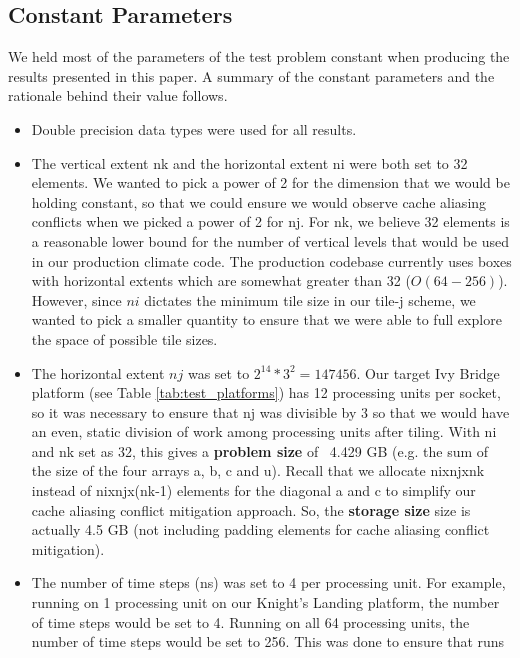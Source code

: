 \documentclass{sig-alternate-05-2015}
\begin{document}
\subsection{Constant Parameters}
\label{sec:experimental_setup:constant_parameters}

We held most of the parameters of the test problem constant when producing the
results presented in this paper. A summary of the constant parameters and the
rationale behind their value follows.

\begin{itemize}
\item Double precision data types were used for all results. 
\item The vertical extent nk and the horizontal extent ni were both set to 32
elements. We wanted to pick a power of 2 for the dimension that we would be
holding constant, so that we could ensure we would observe cache aliasing
conflicts when we picked a power of 2 for nj. For nk, we believe 32 elements is
a reasonable lower bound for the number of vertical levels that would be used
in our production climate code. The production codebase currently uses boxes
with horizontal extents which are somewhat greater than 32 (\(O(64-256)\)).
However, since $ni$ dictates the minimum tile size in our tile-j scheme, we
wanted to pick a smaller quantity to ensure that we were able to full explore
the space of possible tile sizes. 
\item The horizontal extent $nj$ was set to \(2^14*3^2=147456\). Our target Ivy
Bridge platform (see Table \ref{tab:test_platforms}) has 12 processing units
per socket, so it was necessary to ensure that nj was divisible by 3 so that we
would have an even, static division of work among processing units after
tiling. With ni and nk set as 32, this gives a \textbf{problem size} of ~4.429
GB (e.g. the sum of the size of the four arrays a, b, c and u). Recall that we
allocate nixnjxnk instead of nixnjx(nk-1) elements for the diagonal a and c to
simplify our cache aliasing conflict mitigation approach. So, the
\textbf{storage size} size is actually 4.5 GB (not including padding elements
for cache aliasing conflict mitigation).
\item The number of time steps (ns) was set to 4 per processing unit. For
example, running on 1 processing unit on our Knight's Landing platform, the
number of time steps would be set to 4. Running on all 64 processing units, the
number of time steps would be set to 256. This was done to ensure that runs

\end{itemize}
\end{document}
